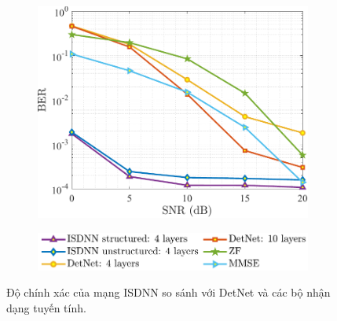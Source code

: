 \begin{figure}[t]
    \centering
    \begin{subfigure}{\linewidth}
        \centering
        \includegraphics[width=.6\linewidth]{figures/performance_1.pdf}
    \end{subfigure}
    \hfill
    \begin{subfigure}{\linewidth}
        \centering
        \includegraphics[width=.5\linewidth]{figures/lg_performance_1.pdf}
    \end{subfigure}
    \caption{Độ chính xác của mạng ISDNN so sánh với DetNet và các bộ nhận dạng tuyến tính.}
    \label{fig:isdnn}
\end{figure}

